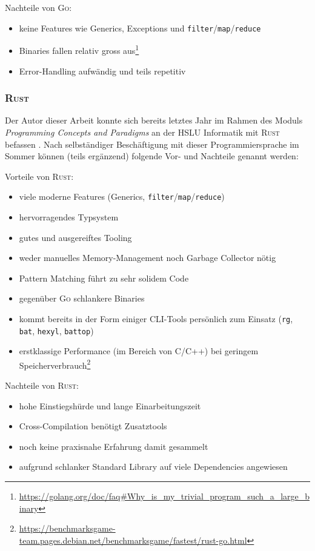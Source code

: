 Nachteile von \textsc{Go}:
\begin{itemize}
    \item keine Features wie Generics, Exceptions und \texttt{filter}/\texttt{map}/\texttt{reduce}
    \item Binaries fallen relativ gross aus\footnote{\url{https://golang.org/doc/faq\#Why\_is\_my\_trivial\_program\_such\_a\_large\_binary}}
    \item Error-Handling aufwändig und teils repetitiv
\end{itemize}

\subsubsection{\textsc{Rust}}

Der Autor dieser Arbeit konnte sich bereits letztes Jahr im Rahmen des Moduls \textit{Programming Concepts and Paradigms} an der HSLU Informatik mit \textsc{Rust} befassen \cite[S. 12]{pcp-rust}. Nach selbständiger Beschäftigung mit dieser Programmiersprache im Sommer können (teils ergänzend) folgende Vor- und Nachteile genannt werden:

Vorteile von \textsc{Rust}:

\begin{itemize}
    \item viele moderne Features (Generics, \texttt{filter}/\texttt{map}/\texttt{reduce})
    \item hervorragendes Typsystem
    \item gutes und ausgereiftes Tooling
    \item weder manuelles Memory-Management noch Garbage Collector nötig
    \item Pattern Matching führt zu sehr solidem Code
    \item gegenüber \textsc{Go} schlankere Binaries
    \item kommt bereits in der Form einiger CLI-Tools persönlich zum Einsatz (\texttt{rg}, \texttt{bat}, \texttt{hexyl}, \texttt{battop})
    \item erstklassige Performance (im Bereich von C/C++) bei geringem Speicherverbrauch\footnote{\url{https://benchmarksgame-team.pages.debian.net/benchmarksgame/fastest/rust-go.html}}
\end{itemize}

Nachteile von \textsc{Rust}:

\begin{itemize}
    \item hohe Einstiegshürde und lange Einarbeitungszeit
    \item Cross-Compilation benötigt Zusatztools
    \item noch keine praxisnahe Erfahrung damit gesammelt
    \item aufgrund schlanker Standard Library auf viele Dependencies angewiesen
\end{itemize}

